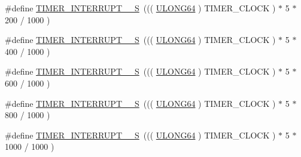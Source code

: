 \begin{DoxyCompactItemize}
\#define \hyperlink{a00673_ga1bf445c2d853b42c6c8f7d704f0c99ce}{TIMER\_\-INTERRUPT\_\_\-S}~((( \hyperlink{a00660_ga28961430434ccabca6862ea93fe9a15b}{ULONG64} ) TIMER\_\-CLOCK ) $\ast$ 5 $\ast$ 200 / 1000 )
\item 
\#define \hyperlink{a00673_gabe6b8cc50a953b9686cec098e74ab340}{TIMER\_\-INTERRUPT\_\_\-S}~((( \hyperlink{a00660_ga28961430434ccabca6862ea93fe9a15b}{ULONG64} ) TIMER\_\-CLOCK ) $\ast$ 5 $\ast$ 400 / 1000 )
\item 
\#define \hyperlink{a00673_gaf80325273d8e20207f0914fd0c8b89ec}{TIMER\_\-INTERRUPT\_\_\-S}~((( \hyperlink{a00660_ga28961430434ccabca6862ea93fe9a15b}{ULONG64} ) TIMER\_\-CLOCK ) $\ast$ 5 $\ast$ 600 / 1000 )
\item 
\#define \hyperlink{a00673_gaab56eb2c0a9908dff18f586c3b83c0e9}{TIMER\_\-INTERRUPT\_\_\-S}~((( \hyperlink{a00660_ga28961430434ccabca6862ea93fe9a15b}{ULONG64} ) TIMER\_\-CLOCK ) $\ast$ 5 $\ast$ 800 / 1000 )
\item 
\#define \hyperlink{a00673_ga0e66fa016e02f9158c8c7ed5ca54c11d}{TIMER\_\-INTERRUPT\_\_\-S}~((( \hyperlink{a00660_ga28961430434ccabca6862ea93fe9a15b}{ULONG64} ) TIMER\_\-CLOCK ) $\ast$ 5 $\ast$ 1000 / 1000 )
\end{DoxyCompactItemize}

